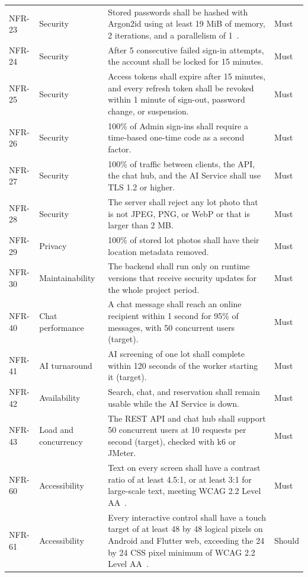 {\begin{longtable}{@{}p{}p{}p{}p{}@{}}
NFR-23 & Security & Stored passwords shall be hashed with Argon2id using at least 19 MiB of memory, 2 iterations, and a parallelism of 1~\citep{owasppasswordstorage}. & Must \\
NFR-24 & Security & After 5 consecutive failed sign-in attempts, the account shall be locked for 15 minutes. & Must \\
NFR-25 & Security & Access tokens shall expire after 15 minutes, and every refresh token shall be revoked within 1 minute of sign-out, password change, or suspension. & Must \\
NFR-26 & Security & 100\% of Admin sign-ins shall require a time-based one-time code as a second factor. & Must \\
NFR-27 & Security & 100\% of traffic between clients, the API, the chat hub, and the AI Service shall use TLS 1.2 or higher. & Must \\
NFR-28 & Security & The server shall reject any lot photo that is not JPEG, PNG, or WebP or that is larger than 2 MB. & Must \\
NFR-29 & Privacy & 100\% of stored lot photos shall have their location metadata removed. & Must \\
NFR-30 & Maintainability & The backend shall run only on runtime versions that receive security updates for the whole project period. & Must \\
NFR-40 & Chat performance & A chat message shall reach an online recipient within 1 second for 95\% of messages, with 50 concurrent users (target). & Must \\
NFR-41 & AI turnaround & AI screening of one lot shall complete within 120 seconds of the worker starting it (target). & Must \\
NFR-42 & Availability & Search, chat, and reservation shall remain usable while the AI Service is down. & Must \\
NFR-43 & Load and concurrency & The REST API and chat hub shall support 50 concurrent users at 10 requests per second (target), checked with k6 or JMeter. & Must \\
NFR-60 & Accessibility & Text on every screen shall have a contrast ratio of at least 4.5:1, or at least 3:1 for large-scale text, meeting WCAG 2.2 Level AA~\citep{wcag22}. & Must \\
NFR-61 & Accessibility & Every interactive control shall have a touch target of at least 48 by 48 logical pixels on Android and Flutter web, exceeding the 24 by 24 CSS pixel minimum of WCAG 2.2 Level AA~\citep{wcag22}. & Should \\

\end{longtable}}
